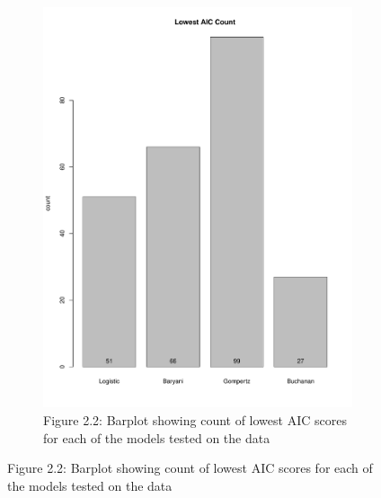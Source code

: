 \begin{figure}[h!]
\begin{subfigure}[h]{0.4\textwidth}
        \includegraphics[scale=0.35]{../Results/bestfit_barplot.pdf}
        \caption{Figure 2.2: Barplot showing count of lowest AIC scores for each of the models tested on the data}
        \label{fig:AIC count}
    \end{subfigure}
\end{figure}

